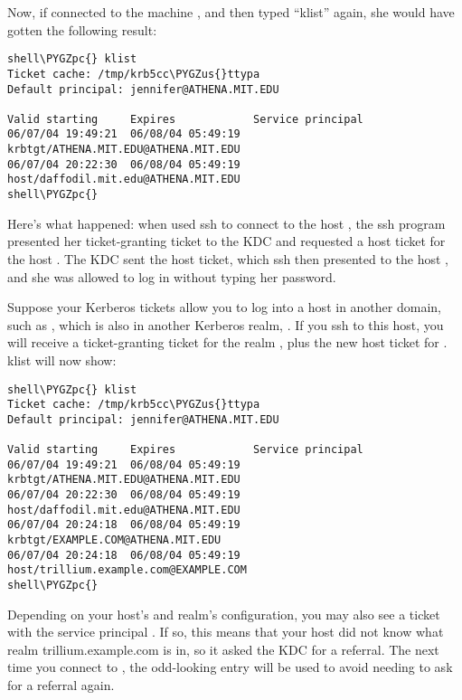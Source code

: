 \documentclass[letterpaper,10pt,english]{sphinxmanual}
\def\PYGZus{\char`\_}
\def\PYGZpc{\char`\%}
\begin{document}
Now, if  connected to the machine ,
and then typed ``klist'' again, she would have gotten the following
result:

\begin{Verbatim}[commandchars=\\\{\}]
shell\PYGZpc{} klist
Ticket cache: /tmp/krb5cc\PYGZus{}ttypa
Default principal: jennifer@ATHENA.MIT.EDU

Valid starting     Expires            Service principal
06/07/04 19:49:21  06/08/04 05:49:19  krbtgt/ATHENA.MIT.EDU@ATHENA.MIT.EDU
06/07/04 20:22:30  06/08/04 05:49:19  host/daffodil.mit.edu@ATHENA.MIT.EDU
shell\PYGZpc{}
\end{Verbatim}

Here's what happened: when  used ssh to connect to the
host , the ssh program presented her
ticket-granting ticket to the KDC and requested a host ticket for the
host .  The KDC sent the host ticket, which ssh
then presented to the host , and she was allowed
to log in without typing her password.

Suppose your Kerberos tickets allow you to log into a host in another
domain, such as , which is also in another
Kerberos realm, .  If you ssh to this host, you will
receive a ticket-granting ticket for the realm , plus
the new host ticket for .  klist will now
show:

\begin{Verbatim}[commandchars=\\\{\}]
shell\PYGZpc{} klist
Ticket cache: /tmp/krb5cc\PYGZus{}ttypa
Default principal: jennifer@ATHENA.MIT.EDU

Valid starting     Expires            Service principal
06/07/04 19:49:21  06/08/04 05:49:19  krbtgt/ATHENA.MIT.EDU@ATHENA.MIT.EDU
06/07/04 20:22:30  06/08/04 05:49:19  host/daffodil.mit.edu@ATHENA.MIT.EDU
06/07/04 20:24:18  06/08/04 05:49:19  krbtgt/EXAMPLE.COM@ATHENA.MIT.EDU
06/07/04 20:24:18  06/08/04 05:49:19  host/trillium.example.com@EXAMPLE.COM
shell\PYGZpc{}
\end{Verbatim}

Depending on your host's and realm's configuration, you may also see a
ticket with the service principal .  If
so, this means that your host did not know what realm
trillium.example.com is in, so it asked the  KDC for
a referral.  The next time you connect to ,
the odd-looking entry will be used to avoid needing to ask for a
referral again.
\end{document}
